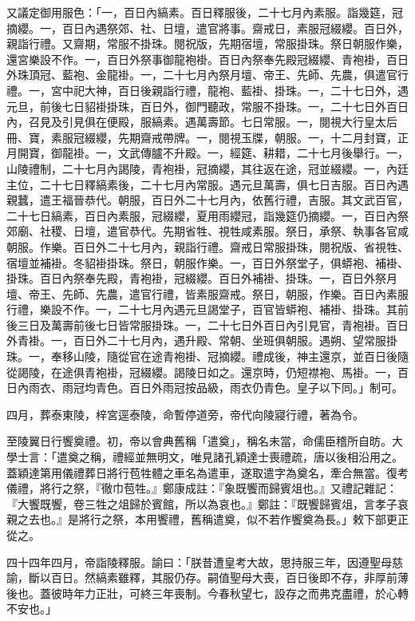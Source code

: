 \begin{pinyinscope}
又議定御用服色：「一，百日內縞素。百日釋服後，二十七月內素服。詣幾筵，冠摘纓。一，百日內遇祭郊、社、日壇，遣官將事。齋戒日，素服冠綴纓。百日外，親詣行禮。又齋期，常服不掛珠。閱祝版，先期宿壇，常服掛珠。祭日朝服作樂，還宮樂設不作。一，百日外祭事御龍袍褂。百日內祭奉先殿冠綴纓、青袍褂，百日外珠頂冠、藍袍、金龍褂。一，二十七月內祭月壇、帝王、先師、先農，俱遣官行禮。一，宮中祀大神，百日後親詣行禮，龍袍、藍褂、掛珠。一，二十七日外，遇元旦，前後七日貂褂掛珠，百日外，御門聽政，常服不掛珠。一，二十七日外百日內，召見及引見俱在便殿，服縞素。遇萬壽節。七日常服。一，閱視大行皇太后冊、寶，素服冠綴纓，先期齋戒帶牌。一，閱視玉牒，朝服。一，十二月封寶，正月開寶，御龍褂。一，文武傳臚不升殿。一，經筵、耕耤，二十七月後舉行。一，山陵禮制，二十七月內謁陵，青袍褂，冠摘纓，其往返在途，冠並綴纓。一，內廷主位，二十七日釋縞素後，二十七月內常服。遇元旦萬壽，俱七日吉服。百日內遇親蠶，遣王福晉恭代。朝服，百日外二十七月內，依舊行禮，吉服。其文武百官，二十七日縞素，百日內素服，冠綴纓，夏用雨纓冠，詣幾筵仍摘纓。一，百日內祭郊廟、社稷、日壇，遣官恭代。先期省牲、視牲咸素服。祭日，承祭、執事各官咸朝服。作樂。百日外二十七月內，親詣行禮。齋戒日常服掛珠，閱祝版、省視牲、宿壇並補褂。冬貂褂掛珠。祭日，朝服作樂。一，百日外祭堂子，俱蟒袍、補褂、掛珠。百日內祭奉先殿，青袍褂，冠綴纓。百日外補褂、掛珠。一，百日外祭月壇、帝王、先師、先農，遣官行禮，皆素服齋戒。祭日，朝服，作樂。百日內素服行禮，樂設不作。一，二十七月內遇元旦謁堂子，百官皆蟒袍、補褂、掛珠。其前後三日及萬壽前後七日皆常服掛珠。一，二十七日外百日內引見官，青袍褂。百日外青褂。一，百日外二十七月內，遇升殿、常朝、坐班俱朝服。遇朔、望常服掛珠。一，奉移山陵，隨從官在途青袍褂、冠摘纓。禮成後，神主還京，並百日後隨從謁陵，在途俱青袍褂，冠綴纓。謁陵日如之。還京時，仍短襟袍、馬褂。一，百日內雨衣、雨冠均青色。百日外雨冠按品級，雨衣仍青色。皇子以下同。」制可。

四月，葬泰東陵，梓宮逕泰陵，命暫停道旁，帝代向陵寢行禮，著為令。

至陵翼日行饗奠禮。初，帝以會典舊稱「遣奠」，稱名未當，命儒臣稽所自昉。大學士言：「遣奠之稱，禮經並無明文，唯見諸孔穎達士喪禮疏，唐以後相沿用之。蓋穎達第用儀禮葬日將行苞牲體之車名為遣車，遂取遣字為奠名，牽合無當。復考儀禮，將行之祭，『徹巾苞牲。』鄭康成註：『象既饗而歸賓俎也。』又禮記雜記：『大饗既饗，卷三牲之俎歸於賓館，所以為哀也。』鄭註：『既饗歸賓俎，言孝子哀親之去也。』是將行之祭，本用饗禮，舊稱遣奠，似不若作饗奠為長。」敕下部更正從之。

四十四年四月，帝詣陵釋服。諭曰：「朕昔遭皇考大故，思持服三年，因遵聖母慈諭，斷以百日。然縞素雖釋，其服仍存。嗣值聖母大喪，百日後即不存，非厚前薄後也。蓋彼時年力正壯，可終三年喪制。今春秋望七，設存之而弗克盡禮，於心轉不安也。」


\end{pinyinscope}
